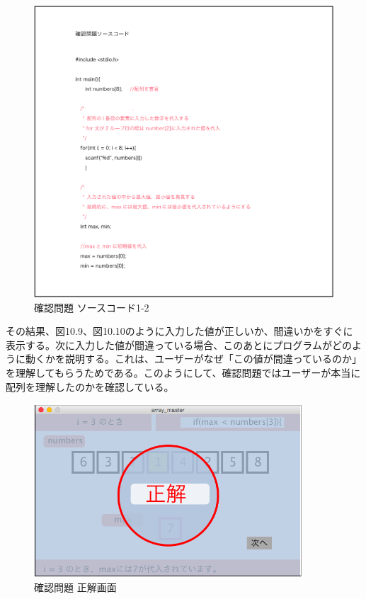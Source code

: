 \documentclass[openany,11pt,papersize]{jsbook}
\begin{document}
\begin{figure}[H]
\begin{center}
\includegraphics[width=14cm, bb=0 0 2545 2474]{img/10thParagraph/kakuninmondai_04.png}
\end{center}
\caption{確認問題 ソースコード1-2}
\end{figure}

その結果、図10.9、図10.10のように入力した値が正しいか、間違いかをすぐに表示する。次に入力した値が間違っている場合、このあとにプログラムがどのように動くかを説明する。これは、ユーザーがなぜ「この値が間違っているのか」を理解してもらうためである。このようにして、確認問題ではユーザーが本当に配列を理解したのかを確認している。


\begin{figure}[H]
\begin{center}
\includegraphics[width=10cm, bb=0 0 645 418]{img/10thParagraph/kakuninmondai_05.png}
\end{center}
\caption{確認問題 正解画面}
\end{figure}
\end{document}
